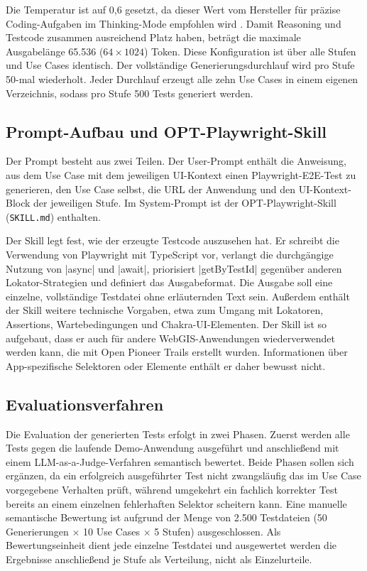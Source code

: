 Die Temperatur ist auf 0{,}6 gesetzt, da dieser Wert vom Hersteller für präzise Coding-Aufgaben im Thinking-Mode empfohlen wird \parencite{hugging_face_qwenqwen36-35b-a3b-fp8_2026}. Damit Reasoning und Testcode zusammen ausreichend Platz haben, beträgt die maximale Ausgabelänge 65.536 ($64 \times 1024$) Token. Diese Konfiguration ist über alle Stufen und Use Cases identisch. Der vollständige Generierungsdurchlauf wird pro Stufe 50-mal wiederholt. Jeder Durchlauf erzeugt alle zehn Use Cases in einem eigenen Verzeichnis, sodass pro Stufe 500 Tests generiert werden.

\subsection{Prompt-Aufbau und OPT-Playwright-Skill}

Der Prompt besteht aus zwei Teilen. Der User-Prompt enthält die Anweisung, aus dem Use Case mit dem jeweiligen \ac{UI}-Kontext einen Playwright-\ac{E2E}-Test zu generieren, den Use Case selbst, die \ac{URL} der Anwendung und den \ac{UI}-Kontext-Block der jeweiligen Stufe. Im System-Prompt ist der \ac{OPT}-Playwright-Skill (\texttt{SKILL.md}) enthalten.

Der Skill legt fest, wie der erzeugte Testcode auszusehen hat. Er schreibt die Verwendung von Playwright mit TypeScript vor, verlangt die durchgängige Nutzung von \code|async| und \code|await|, priorisiert \code|getByTestId| gegenüber anderen Lokator-Strategien und definiert das Ausgabeformat. Die Ausgabe soll eine einzelne, vollständige Testdatei ohne erläuternden Text sein. Außerdem enthält der Skill weitere technische Vorgaben, etwa zum Umgang mit Lokatoren, Assertions, Wartebedingungen und Chakra-UI-Elementen. Der Skill ist so aufgebaut, dass er auch für andere WebGIS-Anwendungen wiederverwendet werden kann, die mit Open Pioneer Trails erstellt wurden. Informationen über App-spezifische Selektoren oder Elemente enthält er daher bewusst nicht.

\subsection{Evaluationsverfahren}

Die Evaluation der generierten Tests erfolgt in zwei Phasen. Zuerst werden alle Tests gegen die laufende Demo-Anwendung ausgeführt und anschließend mit einem LLM-as-a-Judge-Verfahren semantisch bewertet. Beide Phasen sollen sich ergänzen, da ein erfolgreich ausgeführter Test nicht zwangsläufig das im Use Case vorgegebene Verhalten prüft, während umgekehrt ein fachlich korrekter Test bereits an einem einzelnen fehlerhaften Selektor scheitern kann. Eine manuelle semantische Bewertung ist aufgrund der Menge von 2.500 Testdateien (50 Generierungen $\times$ 10 Use Cases $\times$ 5 Stufen) ausgeschlossen. Als Bewertungseinheit dient jede einzelne Testdatei und ausgewertet werden die Ergebnisse anschließend je Stufe als Verteilung, nicht als Einzelurteile.

